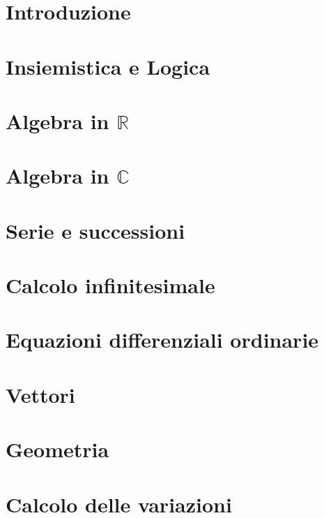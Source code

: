 
\part{Introduzione}\label{book:introduction}


\part{Insiemistica e Logica}\label{book:logics}


\part{Algebra in $\mathbb{R}$}\label{book:algebra}


\part{Algebra in $\mathbb{C}$}\label{book:complex_algebra}


\part{Serie e successioni}\label{book:series}


\part{Calcolo infinitesimale}\label{book:calculus}


\part{Equazioni differenziali ordinarie}\label{book:ode}


\part{Vettori}\label{book:vectors}


\part{Geometria}\label{book:geometry}


\part{Calcolo delle variazioni}\label{book:variations}


